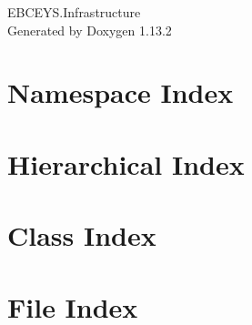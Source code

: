 \documentclass[twoside]{book}
\newcommand{\+}{\discretionary{\mbox{\scriptsize$\hookleftarrow$}}{}{}}
\newcommand{\clearemptydoublepage}{%
    \newpage{\pagestyle{empty}\cleardoublepage}%
  }
\begin{document}
  \raggedbottom
    \hypersetup{pageanchor=false,
                bookmarksnumbered=true,
                pdfencoding=unicode
               }
  \begin{titlepage}
  \vspace*{7cm}
  \begin{center}%
  {\Large EBCEYS.\+Infrastructure}\\
  \vspace*{1cm}
  {\large Generated by Doxygen 1.13.2}\\
  \end{center}
  \end{titlepage}
  \clearemptydoublepage
  \tableofcontents
  \clearemptydoublepage
  \hypersetup{pageanchor=true}
\chapter{Namespace Index}

\chapter{Hierarchical Index}

\chapter{Class Index}

\chapter{File Index}

\end{document}
